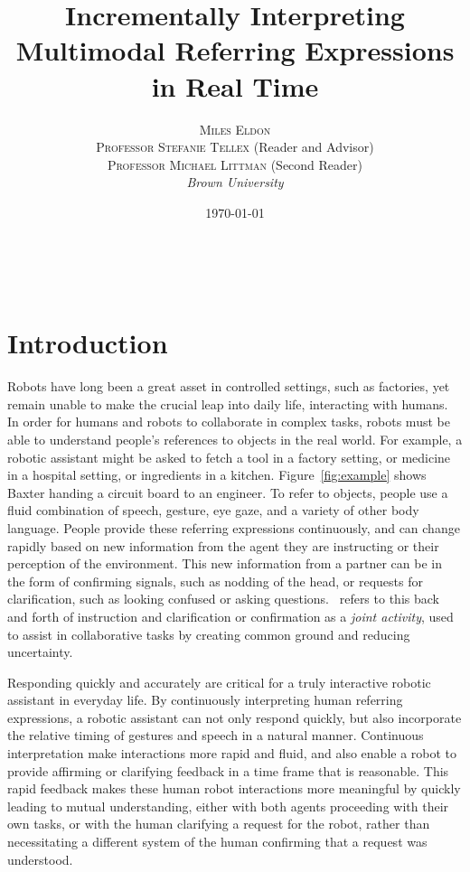 \documentclass[a4paper, 11pt]{article} %
\title{\textbf{Incrementally Interpreting Multimodal Referring Expressions in Real Time}} %
\author{\textsc{Miles Eldon}\\ %
\textsc{Professor Stefanie Tellex} (Reader and Advisor)\\
{\textsc{Professor Michael Littman} (Second Reader)}
\\{\textit{Brown University}}} %
\date{\today} %
\makeatletter
\renewcommand{\maketitle}{ %
\begin{flushright} %
{\LARGE\@title} %

\vspace{50pt} %

{\large\@author} %
\\\@date %

\vspace{40pt} %
\end{flushright}
}
\makeatother
\begin{document}
\maketitle %
\newpage
\tableofcontents
\newpage
\section{Introduction}
Robots have long been a great asset in controlled settings, such as factories, yet remain unable to make the crucial leap into daily life, interacting with humans. In order for humans and robots to collaborate in complex tasks, robots must be able to understand people's references to objects in the real world. For example, a robotic assistant might be asked to fetch a tool in a factory setting, or medicine in a hospital setting, or ingredients in a kitchen. Figure~\ref{fig:example} shows Baxter handing a circuit board to an engineer. To refer to objects, people use a fluid combination of speech, gesture, eye gaze, and a variety of other body language. People provide these referring expressions continuously, and can change rapidly based on new information from the agent they are instructing or their perception of the environment. This new information from a partner can be in the form of confirming signals, such as nodding of the head, or requests for clarification, such as looking confused or asking questions.~\citet{clark96} refers to this back and forth of instruction and clarification or confirmation as a \textit{joint activity}, used to assist in collaborative tasks by creating common ground and reducing uncertainty.


Responding quickly and accurately are critical for a truly interactive robotic assistant in everyday life. By continuously interpreting human referring expressions, a robotic assistant can not only respond quickly, but also incorporate the relative timing of gestures and speech in a natural manner. Continuous interpretation make interactions more rapid and fluid, and also enable a robot to provide affirming or clarifying feedback in a time frame that is reasonable. This rapid feedback makes these human robot interactions more meaningful by quickly leading to mutual understanding, either with both agents proceeding with their own tasks, or with the human clarifying a request for the robot, rather than necessitating a different system of the human confirming that a request was understood.
\end{document}
